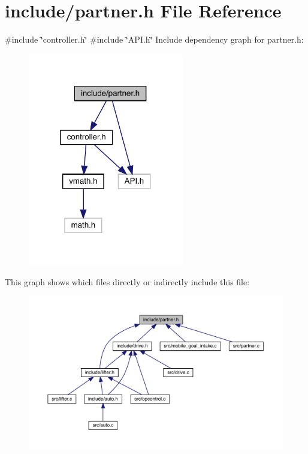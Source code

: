 \section{include/partner.h File Reference}
\label{partner_8h}
{\ttfamily \#include \char`\"{}controller.\+h\char`\"{}}\newline
{\ttfamily \#include \char`\"{}A\+P\+I.\+h\char`\"{}}\newline
Include dependency graph for partner.\+h\+:
\nopagebreak
\begin{figure}[H]
\begin{center}
\leavevmode
\includegraphics[width=193pt]{partner_8h__incl}
\end{center}
\end{figure}
This graph shows which files directly or indirectly include this file\+:
\nopagebreak
\begin{figure}[H]
\begin{center}
\leavevmode
\includegraphics[width=350pt]{partner_8h__dep__incl}
\end{center}
\end{figure}
